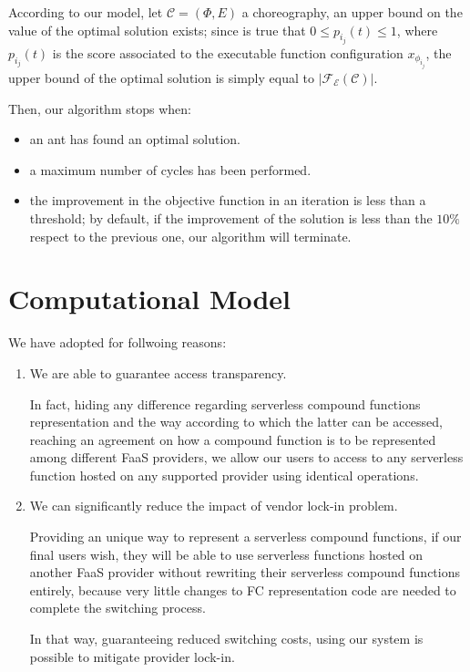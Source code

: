 \documentclass[12pt,a4paper]{report}
\begin{document}
According to our model, let $\mathcal{C} = (\Phi,E)$ a choreography, an upper bound on the value of the optimal solution exists; since is true that $0 \leq p_{i_j}(t) \leq 1$, where $p_{i_j}(t)$ is the score associated to the executable function configuration $x_{\phi_{i_j}}$, the upper bound of the optimal solution is simply equal to $|\mathscr{F_E}(\mathcal{C})|$.

Then, our algorithm stops when:

\begin{itemize}
	\item an ant has found an optimal solution.
	\item a maximum number of cycles has been performed.
	\item the improvement in the objective function in an iteration is less than a threshold; by default, if the improvement of the solution is less than the $10\%$ respect to the previous one, our algorithm will terminate.
\end{itemize}


\newpage


\chapter{Computational Model}





We have adopted for follwoing reasons:

\begin{enumerate}
	\item We are able to guarantee access transparency. 
	
	In fact, hiding any difference regarding serverless compound functions representation and the way according to which the latter can be accessed, reaching an agreement on how a compound function is to be represented among different FaaS providers, we allow our users to access to any serverless function hosted on any supported provider using identical operations.
	
	\item We can significantly reduce the impact of vendor lock-in problem. 
	
	Providing an unique way to represent a serverless compound functions, if our final users wish, they will be able to use serverless functions hosted on another FaaS provider without rewriting their serverless compound functions entirely, because very little changes to FC representation code are needed to complete the switching process. 
	
	In that way, guaranteeing reduced switching costs, using our system is possible to mitigate provider lock-in.
	
\end{enumerate}
\end{document}

